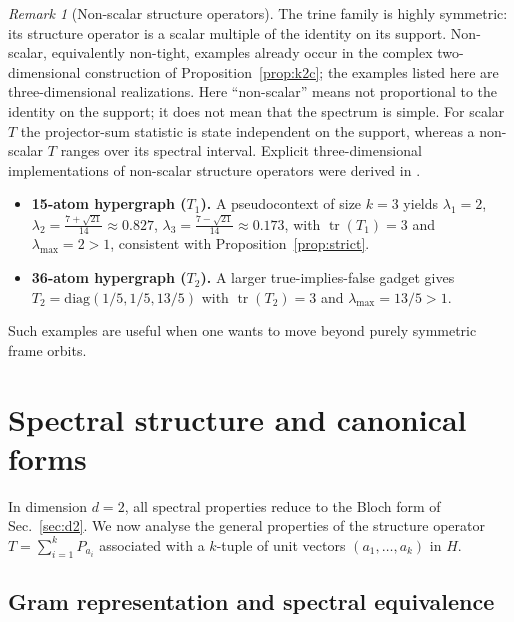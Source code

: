 \documentclass[
  twocolumn,
  aps,
  pra,
  floatfix,
  amsmath,amssymb,
  longbibliography
]{revtex4-2}
\theoremstyle{definition}
\theoremstyle{remark}
\newtheorem{remark}[theorem]{Remark}
\begin{document}
\begin{remark}[Non-scalar structure operators]\label{rem:non_scalar}
The trine family is highly symmetric: its structure operator is a
scalar multiple of the identity on its support.  Non-scalar,
equivalently non-tight, examples already occur in the complex
two-dimensional construction of Proposition~\ref{prop:k2c}; the
examples listed here are three-dimensional realizations.  Here
``non-scalar'' means not proportional to the identity on the support;
it does not mean that the spectrum is simple.  For scalar $T$ the
projector-sum statistic is state independent on the support, whereas a
non-scalar $T$ ranges over its spectral interval.
%
Explicit three-dimensional implementations of non-scalar structure
operators were derived in \cite{2023-navara-svozil}.

\begin{itemize}

\item \textbf{15-atom hypergraph ($T_1$).}  A pseudocontext of size
  ${k=3}$
  yields
  \(
    \lambda_1=2\),
  \(\lambda_2=\tfrac{7+\sqrt{21}}{14}\approx 0.827\),
 \(\lambda_3=\tfrac{7-\sqrt{21}}{14}\approx 0.173\),
  with $\operatorname{tr}(T_1)=3$ and $\lambda_{\max}=2>1$, consistent
  with Proposition~\ref{prop:strict}.

\item \textbf{36-atom hypergraph ($T_2$).}  A larger true-implies-false
  gadget gives $T_2=\mathrm{diag}(1/5,1/5,13/5)$ with
  $\operatorname{tr}(T_2)=3$ and $\lambda_{\max}=13/5>1$.

\end{itemize}

Such
examples are useful when one wants to move beyond purely symmetric
frame orbits.
\end{remark}

\section{Spectral structure and canonical forms}
\label{sec:spectral}

In dimension $d=2$, all spectral properties reduce to the Bloch form
of Sec.~\ref{sec:d2}.  We now analyse the general properties of the
structure operator $T=\sum_{i=1}^{k}P_{a_i}$ associated with a
$k$-tuple of unit vectors $(a_1,\ldots,a_k)$ in $H$.

\subsection{Gram representation and spectral equivalence}
\end{document}

